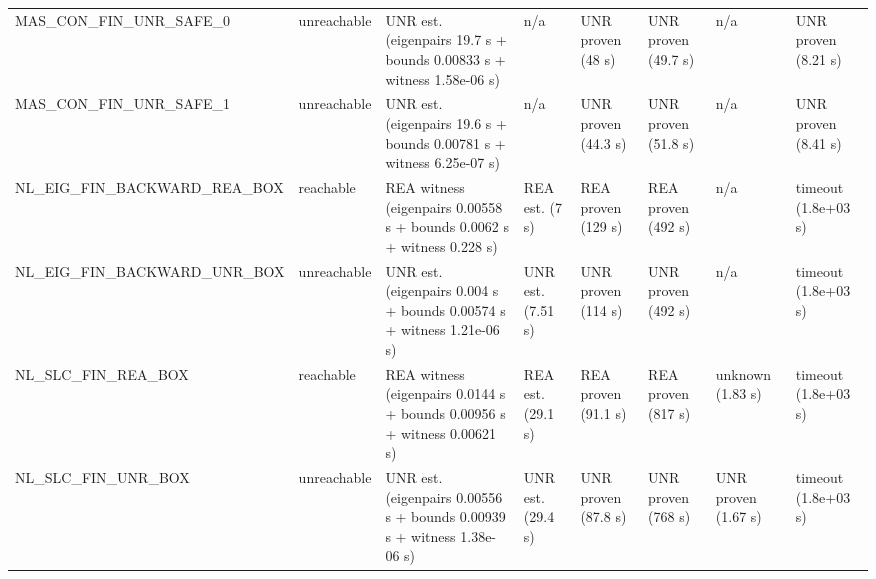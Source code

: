 \begin{tabular}{llllllll}
MAS\_CON\_FIN\_UNR\_SAFE\_0 & unreachable & UNR est. (eigenpairs 19.7 s + bounds 0.00833 s + witness 1.58e-06 s) & n/a & UNR proven (48 s) & UNR proven (49.7 s) & n/a & UNR proven (8.21 s) \\
MAS\_CON\_FIN\_UNR\_SAFE\_1 & unreachable & UNR est. (eigenpairs 19.6 s + bounds 0.00781 s + witness 6.25e-07 s) & n/a & UNR proven (44.3 s) & UNR proven (51.8 s) & n/a & UNR proven (8.41 s) \\
NL\_EIG\_FIN\_BACKWARD\_REA\_BOX & reachable & REA witness (eigenpairs 0.00558 s + bounds 0.0062 s + witness 0.228 s) & REA est. (7 s) & REA proven (129 s) & REA proven (492 s) & n/a & timeout (1.8e+03 s) \\
NL\_EIG\_FIN\_BACKWARD\_UNR\_BOX & unreachable & UNR est. (eigenpairs 0.004 s + bounds 0.00574 s + witness 1.21e-06 s) & UNR est. (7.51 s) & UNR proven (114 s) & UNR proven (492 s) & n/a & timeout (1.8e+03 s) \\
NL\_SLC\_FIN\_REA\_BOX & reachable & REA witness (eigenpairs 0.0144 s + bounds 0.00956 s + witness 0.00621 s) & REA est. (29.1 s) & REA proven (91.1 s) & REA proven (817 s) & unknown (1.83 s) & timeout (1.8e+03 s) \\
NL\_SLC\_FIN\_UNR\_BOX & unreachable & UNR est. (eigenpairs 0.00556 s + bounds 0.00939 s + witness 1.38e-06 s) & UNR est. (29.4 s) & UNR proven (87.8 s) & UNR proven (768 s) & UNR proven (1.67 s) & timeout (1.8e+03 s) \\
\bottomrule
\end{tabular}
